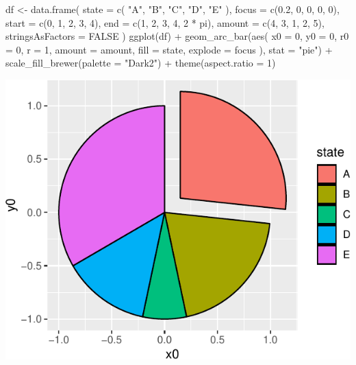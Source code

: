 \documentclass[
  letterpaper,
  DIV=11,
  numbers=noendperiod]{scrreprt}
\newenvironment{Shaded}{\begin{snugshade}}{\end{snugshade}}
\newcommand{\AttributeTok}[1]{\textcolor[rgb]{0.40,0.45,0.13}{#1}}
\newcommand{\ConstantTok}[1]{\textcolor[rgb]{0.56,0.35,0.01}{#1}}
\newcommand{\DecValTok}[1]{\textcolor[rgb]{0.68,0.00,0.00}{#1}}
\newcommand{\FloatTok}[1]{\textcolor[rgb]{0.68,0.00,0.00}{#1}}
\newcommand{\FunctionTok}[1]{\textcolor[rgb]{0.28,0.35,0.67}{#1}}
\newcommand{\NormalTok}[1]{\textcolor[rgb]{0.00,0.23,0.31}{#1}}
\newcommand{\OtherTok}[1]{\textcolor[rgb]{0.00,0.23,0.31}{#1}}
\newcommand{\SpecialCharTok}[1]{\textcolor[rgb]{0.37,0.37,0.37}{#1}}
\newcommand{\StringTok}[1]{\textcolor[rgb]{0.13,0.47,0.30}{#1}}
\begin{document}
\begin{Shaded}
\begin{Highlighting}[]
\NormalTok{df }\OtherTok{\textless{}{-}} \FunctionTok{data.frame}\NormalTok{(}
  \AttributeTok{state =} \FunctionTok{c}\NormalTok{(}
    \StringTok{"A"}\NormalTok{, }\StringTok{"B"}\NormalTok{, }\StringTok{"C"}\NormalTok{,}
    \StringTok{"D"}\NormalTok{, }\StringTok{"E"}
\NormalTok{  ),}
  \AttributeTok{focus =} \FunctionTok{c}\NormalTok{(}\FloatTok{0.2}\NormalTok{, }\DecValTok{0}\NormalTok{, }\DecValTok{0}\NormalTok{, }\DecValTok{0}\NormalTok{, }\DecValTok{0}\NormalTok{),}
  \AttributeTok{start =} \FunctionTok{c}\NormalTok{(}\DecValTok{0}\NormalTok{, }\DecValTok{1}\NormalTok{, }\DecValTok{2}\NormalTok{, }\DecValTok{3}\NormalTok{, }\DecValTok{4}\NormalTok{),}
  \AttributeTok{end =} \FunctionTok{c}\NormalTok{(}\DecValTok{1}\NormalTok{, }\DecValTok{2}\NormalTok{, }\DecValTok{3}\NormalTok{, }\DecValTok{4}\NormalTok{, }\DecValTok{2} \SpecialCharTok{*}\NormalTok{ pi),}
  \AttributeTok{amount =} \FunctionTok{c}\NormalTok{(}\DecValTok{4}\NormalTok{, }\DecValTok{3}\NormalTok{, }\DecValTok{1}\NormalTok{, }\DecValTok{2}\NormalTok{, }\DecValTok{5}\NormalTok{),}
  \AttributeTok{stringsAsFactors =} \ConstantTok{FALSE}
\NormalTok{)}
\FunctionTok{ggplot}\NormalTok{(df) }\SpecialCharTok{+}
  \FunctionTok{geom\_arc\_bar}\NormalTok{(}\FunctionTok{aes}\NormalTok{(}
    \AttributeTok{x0 =} \DecValTok{0}\NormalTok{, }\AttributeTok{y0 =} \DecValTok{0}\NormalTok{, }\AttributeTok{r0 =} \DecValTok{0}\NormalTok{, }\AttributeTok{r =} \DecValTok{1}\NormalTok{, }\AttributeTok{amount =}\NormalTok{ amount,}
    \AttributeTok{fill =}\NormalTok{ state, }\AttributeTok{explode =}\NormalTok{ focus}
\NormalTok{  ), }\AttributeTok{stat =} \StringTok{"pie"}\NormalTok{) }\SpecialCharTok{+}
  \FunctionTok{scale\_fill\_brewer}\NormalTok{(}\AttributeTok{palette =} \StringTok{"Dark2"}\NormalTok{) }\SpecialCharTok{+}
  \FunctionTok{theme}\NormalTok{(}\AttributeTok{aspect.ratio =} \DecValTok{1}\NormalTok{)}
\end{Highlighting}
\end{Shaded}

\includegraphics{a_files/figure-pdf/unnamed-chunk-3-1.pdf}
\end{document}
